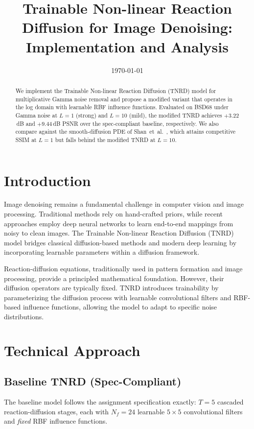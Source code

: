 \documentclass[10pt,conference]{IEEEtran}
\title{Trainable Non-linear Reaction Diffusion for Image Denoising: Implementation and Analysis}
\author{\IEEEauthorblockN{MMIP TNRD Project}}
\date{\today}
\begin{document}
\maketitle

\begin{abstract}
We implement the Trainable Non-linear Reaction Diffusion (TNRD) model for
multiplicative Gamma noise removal and propose a modified variant that operates
in the log domain with learnable RBF influence functions.  Evaluated on BSD68
under Gamma noise at $L{=}1$ (strong) and $L{=}10$ (mild), the modified TNRD
achieves $+3.22$\,dB and $+9.44$\,dB PSNR over the spec-compliant baseline,
respectively.  We also compare against the smooth-diffusion PDE of
Shan~et~al.\ \cite{shan2019}, which attains competitive SSIM at $L{=}1$ but
falls behind the modified TNRD at $L{=}10$.
\end{abstract}

\section{Introduction}
Image denoising remains a fundamental challenge in computer vision and image processing. Traditional methods rely on hand-crafted priors, while recent approaches employ deep neural networks to learn end-to-end mappings from noisy to clean images. The Trainable Non-linear Reaction Diffusion (TNRD) model bridges classical diffusion-based methods and modern deep learning by incorporating learnable parameters within a diffusion framework.

Reaction-diffusion equations, traditionally used in pattern formation and image processing, provide a principled mathematical foundation. However, their diffusion operators are typically fixed. TNRD introduces trainability by parameterizing the diffusion process with learnable convolutional filters and RBF-based influence functions, allowing the model to adapt to specific noise distributions.

\section{Technical Approach}

\subsection{Baseline TNRD (Spec-Compliant)}

The baseline model follows the assignment specification exactly: $T{=}5$
cascaded reaction-diffusion stages, each with $N_f{=}24$ learnable $5{\times}5$
convolutional filters and \emph{fixed} RBF influence functions.
\end{document}
